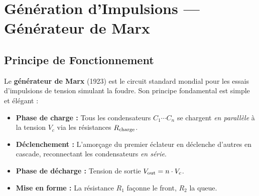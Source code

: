 \documentclass[12pt, a4paper, twoside]{report}
\begin{document}
\section{Génération d'Impulsions — Générateur de Marx}

\subsection{Principe de Fonctionnement}

Le \textbf{générateur de Marx} (1923) est le circuit standard mondial pour les essais
d'impulsions de tension simulant la foudre. Son principe fondamental est simple et
élégant :

\begin{itemize}
  \item \textbf{Phase de charge :} Tous les condensateurs $C_1 \cdots C_n$ se chargent
    \textit{en parallèle} à la tension $V_c$ via les résistances $R_{\rm charge}$.
  \item \textbf{Déclenchement :} L'amorçage du premier éclateur en déclenche d'autres en
    cascade, reconnectant les condensateurs \textit{en série}.
  \item \textbf{Phase de décharge :} Tension de sortie $V_{\rm out} = n \cdot V_c$.
  \item \textbf{Mise en forme :} La résistance $R_1$ façonne le front, $R_2$ la queue.
\end{itemize}
\end{document}
